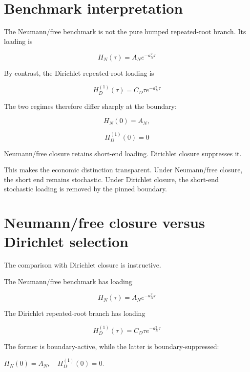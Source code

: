 \documentclass[11pt,oneside]{book}
\begin{document}
\section{Benchmark interpretation}\label{benchmark-interpretation}

The Neumann/free benchmark is not the pure humped repeated-root branch.
Its loading is

\[
H_N(\tau) = A_N e^{-a_N^2\tau}
\]

By contrast, the Dirichlet repeated-root loading is

\[
H_D^{(1)}(\tau) = C_D \tau e^{-a_D^2\tau}
\]

The two regimes therefore differ sharply at the boundary:

\[
H_N(0) = A_N,
\]

\[
H_D^{(1)}(0) = 0
\]

Neumann/free closure retains short-end loading. Dirichlet closure suppresses
it.

This makes the economic distinction transparent. Under Neumann/free closure,
the short end remains stochastic. Under Dirichlet closure, the short-end
stochastic loading is removed by the pinned boundary.

\section{Neumann/free closure versus Dirichlet
selection}\label{natural-closure-versus-dirichlet-selection}

The comparison with Dirichlet closure is instructive.

The Neumann/free benchmark has loading

\[
H_N(\tau) = A_N e^{-a_N^2\tau}
\]

The Dirichlet repeated-root branch has loading

\[
H_D^{(1)}(\tau) = C_D \tau e^{-a_D^2\tau}
\]

The former is boundary-active, while the latter is boundary-suppressed:

$H_N(0)=A_N,\quad H_D^{(1)}(0)=0$.
\end{document}
